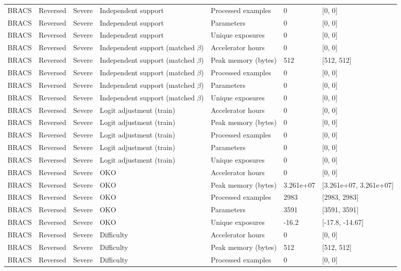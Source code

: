 \begin{longtable}{lllllll}
BRACS & Reversed & Severe & Independent support & Processed examples & 0 & [0, 0] \\
BRACS & Reversed & Severe & Independent support & Parameters & 0 & [0, 0] \\
BRACS & Reversed & Severe & Independent support & Unique exposures & 0 & [0, 0] \\
BRACS & Reversed & Severe & Independent support (matched $\beta$) & Accelerator hours & 0 & [0, 0] \\
BRACS & Reversed & Severe & Independent support (matched $\beta$) & Peak memory (bytes) & 512 & [512, 512] \\
BRACS & Reversed & Severe & Independent support (matched $\beta$) & Processed examples & 0 & [0, 0] \\
BRACS & Reversed & Severe & Independent support (matched $\beta$) & Parameters & 0 & [0, 0] \\
BRACS & Reversed & Severe & Independent support (matched $\beta$) & Unique exposures & 0 & [0, 0] \\
BRACS & Reversed & Severe & Logit adjustment (train) & Accelerator hours & 0 & [0, 0] \\
BRACS & Reversed & Severe & Logit adjustment (train) & Peak memory (bytes) & 0 & [0, 0] \\
BRACS & Reversed & Severe & Logit adjustment (train) & Processed examples & 0 & [0, 0] \\
BRACS & Reversed & Severe & Logit adjustment (train) & Parameters & 0 & [0, 0] \\
BRACS & Reversed & Severe & Logit adjustment (train) & Unique exposures & 0 & [0, 0] \\
BRACS & Reversed & Severe & OKO & Accelerator hours & 0 & [0, 0] \\
BRACS & Reversed & Severe & OKO & Peak memory (bytes) & 3.261e+07 & [3.261e+07, 3.261e+07] \\
BRACS & Reversed & Severe & OKO & Processed examples & 2983 & [2983, 2983] \\
BRACS & Reversed & Severe & OKO & Parameters & 3591 & [3591, 3591] \\
BRACS & Reversed & Severe & OKO & Unique exposures & -16.2 & [-17.8, -14.67] \\
BRACS & Reversed & Severe & Difficulty & Accelerator hours & 0 & [0, 0] \\
BRACS & Reversed & Severe & Difficulty & Peak memory (bytes) & 512 & [512, 512] \\
BRACS & Reversed & Severe & Difficulty & Processed examples & 0 & [0, 0] \\

\end{longtable}
